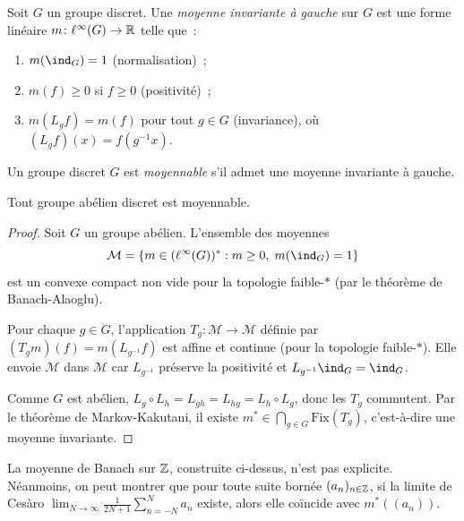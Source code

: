 \begin{definition}
Soit $G$ un groupe discret. Une \emph{moyenne invariante \`a gauche} sur $G$ est une forme
lin\'eaire $m\colon \ell^\infty(G) \to \mathbb{R}$ telle que~:
\begin{enumerate}
  \item $m(\ind_G) = 1$ (normalisation)~;
  \item $m(f) \geq 0$ si $f \geq 0$ (positivit\'e)~;
  \item $m(L_g f) = m(f)$ pour tout $g \in G$ (invariance), o\`u $(L_g f)(x) = f(g^{-1}x)$.
\end{enumerate}
\end{definition}

\begin{definition}
Un groupe discret $G$ est \emph{moyennable} s'il admet une moyenne invariante \`a gauche.
\end{definition}

\begin{theoreme}
\label{thm:abelien-moyennable}
Tout groupe ab\'elien discret est moyennable.
\end{theoreme}

\begin{proof}
Soit $G$ un groupe ab\'elien. L'ensemble des moyennes
\[
  \mathcal{M} = \{m \in (\ell^\infty(G))^* : m \geq 0, \; m(\ind_G) = 1\}
\]
est un convexe compact non vide pour la topologie faible-$*$ (par le th\'eor\`eme de
Banach-Alaoglu).

Pour chaque $g \in G$, l'application $T_g\colon \mathcal{M} \to \mathcal{M}$ d\'efinie par
$(T_g m)(f) = m(L_{g^{-1}} f)$ est affine et continue (pour la topologie faible-$*$).
Elle envoie $\mathcal{M}$ dans $\mathcal{M}$ car $L_{g^{-1}}$ pr\'eserve la positivit\'e
et $L_{g^{-1}} \ind_G = \ind_G$.

Comme $G$ est ab\'elien, $L_g \circ L_h = L_{gh} = L_{hg} = L_h \circ L_g$, donc les
$T_g$ commutent. Par le th\'eor\`eme de Markov-Kakutani, il existe
$m^* \in \bigcap_{g \in G} \mathrm{Fix}(T_g)$, c'est-\`a-dire une moyenne invariante.
\end{proof}

\begin{exemple}
La moyenne de Banach sur $\mathbb{Z}$, construite ci-dessus, n'est pas explicite. N\'eanmoins, on
peut montrer que pour toute suite born\'ee $(a_n)_{n \in \mathbb{Z}}$, si la limite de Ces\`aro
$\lim_{N \to \infty} \frac{1}{2N+1} \sum_{n=-N}^{N} a_n$ existe, alors elle co\"incide
avec $m^*((a_n))$.
\end{exemple}


